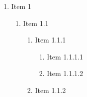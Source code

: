 \documentclass[a4paper]{article}
\begin{document}
\begin{enumerate}
  \item \textlatin{Item} 1
  \begin{enumerate}
    \item \textlatin{Item} 1.1
    \begin{enumerate}
      \item \textlatin{Item} 1.1.1
       \begin{enumerate}
         \item \textlatin{Item} 1.1.1.1
         \item \textlatin{Item} 1.1.1.2
       \end{enumerate}
      \item \textlatin{Item} 1.1.2
    \end{enumerate}
  \end{enumerate}
\end{enumerate}
\end{document}
